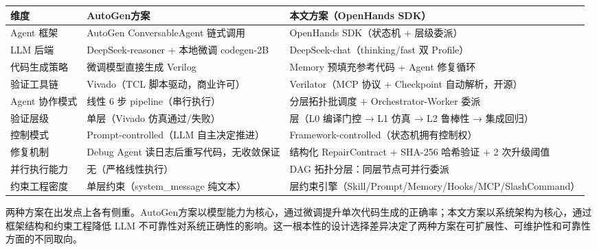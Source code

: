 {\def\LTcaptype{none} %
\begin{longtable}[]{@{}
  >{\raggedright\arraybackslash}p{}
  >{\raggedright\arraybackslash}p{}
  >{\raggedright\arraybackslash}p{}@{}}
\toprule\noalign{}
\begin{minipage}[b]{\linewidth}\raggedright
维度
\end{minipage} & \begin{minipage}[b]{\linewidth}\raggedright
AutoGen方案
\end{minipage} & \begin{minipage}[b]{\linewidth}\raggedright
本文方案（OpenHands SDK）
\end{minipage} \\
\midrule\noalign{}
\endhead
\bottomrule\noalign{}
\endlastfoot
Agent 框架 & AutoGen ConversableAgent 链式调用 & OpenHands SDK（状态机 +
层级委派） \\
LLM 后端 & DeepSeek-reasoner + 本地微调 codegen-2B &
DeepSeek-chat（thinking/fast 双 Profile） \\
代码生成策略 & 微调模型直接生成 Verilog & Memory 预填充参考代码 + Agent
修复循环 \\
验证工具链 & Vivado（TCL 脚本驱动，商业许可） & Verilator（MCP 协议 +
Checkpoint 自动解析，开源） \\
Agent 协作模式 & 线性 6 步 pipeline（串行执行） & 分层拓扑批调度 +
Orchestrator-Worker 委派 \\
验证层级 & 单层（Vivado 仿真通过/失败） & 4 层（L0 编译门控 → L1 仿真 →
L2 鲁棒性 → 集成回归） \\
控制模式 & Prompt-controlled（LLM 自主决定推进） &
Framework-controlled（状态机拥有控制权） \\
修复机制 & Debug Agent 读日志后重写代码，无收敛保证 & 结构化
RepairContract + SHA-256 哈希验证 + 2 次升级阈值 \\
并行执行能力 & 无（严格线性执行） & DAG 拓扑分层：同层节点可并行委派 \\
约束工程密度 & 单层约束（system\_message 纯文本） & 6
层约束引擎（Skill/Prompt/Memory/Hooks/MCP/SlashCommand） \\
\end{longtable}
}

两种方案在出发点上各有侧重。AutoGen方案以模型能力为核心，通过微调提升单次代码生成的正确率；本文方案以系统架构为核心，通过框架结构和约束工程降低
LLM
不可靠性对系统正确性的影响。这一根本性的设计选择差异决定了两种方案在可扩展性、可维护性和可靠性方面的不同取向。

